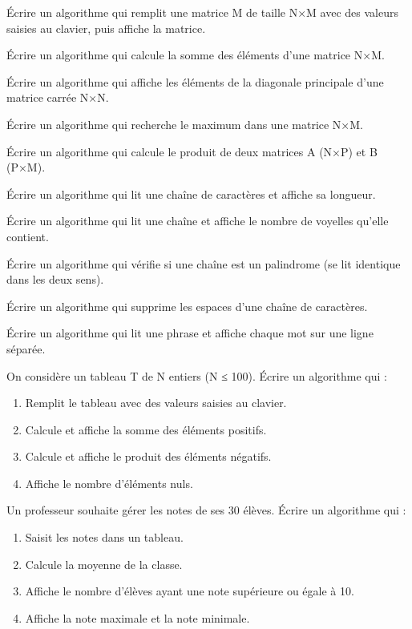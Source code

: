 
\exo{}
Écrire un algorithme qui remplit une matrice M de taille N×M avec des valeurs saisies au clavier, puis affiche la matrice.

\exo{}
Écrire un algorithme qui calcule la somme des éléments d'une matrice N×M.

\exo{}
Écrire un algorithme qui affiche les éléments de la diagonale principale d'une matrice carrée N×N.

\exo{}
Écrire un algorithme qui recherche le maximum dans une matrice N×M.

\exo{}
Écrire un algorithme qui calcule le produit de deux matrices A (N×P) et B (P×M).


\exo{}
Écrire un algorithme qui lit une chaîne de caractères et affiche sa longueur.

\exo{}
Écrire un algorithme qui lit une chaîne et affiche le nombre de voyelles qu'elle contient.

\exo{}
Écrire un algorithme qui vérifie si une chaîne est un palindrome (se lit identique dans les deux sens).

\exo{}
Écrire un algorithme qui supprime les espaces d'une chaîne de caractères.

\exo{}
Écrire un algorithme qui lit une phrase et affiche chaque mot sur une ligne séparée.


\sujetbac[2023, Cameroun, C]
On considère un tableau T de N entiers (N ≤ 100). Écrire un algorithme qui :
\begin{enumerate}
    \item Remplit le tableau avec des valeurs saisies au clavier.
    \item Calcule et affiche la somme des éléments positifs.
    \item Calcule et affiche le produit des éléments négatifs.
    \item Affiche le nombre d'éléments nuls.
\end{enumerate}

\sujetbac[2022, Cameroun, D]
Un professeur souhaite gérer les notes de ses 30 élèves. Écrire un algorithme qui :
\begin{enumerate}
    \item Saisit les notes dans un tableau.
    \item Calcule la moyenne de la classe.
    \item Affiche le nombre d'élèves ayant une note supérieure ou égale à 10.
    \item Affiche la note maximale et la note minimale.
\end{enumerate}


